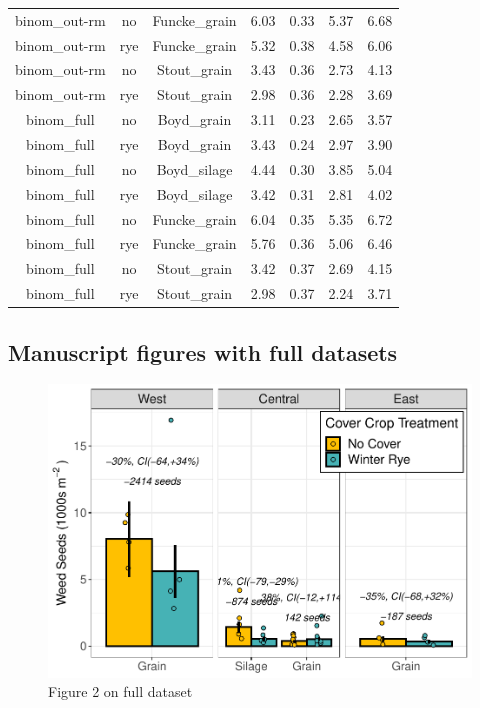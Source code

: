 \documentclass[]{article}
\begin{document}
\begin{table}[H]
\begin{tabular}[t]{ccccccc}
\addlinespace
\rowcolor{gray!6}  binom\_out-rm & no & Funcke\_grain & 6.03 & 0.33 & 5.37 & 6.68\\
binom\_out-rm & rye & Funcke\_grain & 5.32 & 0.38 & 4.58 & 6.06\\
\rowcolor{gray!6}  binom\_out-rm & no & Stout\_grain & 3.43 & 0.36 & 2.73 & 4.13\\
binom\_out-rm & rye & Stout\_grain & 2.98 & 0.36 & 2.28 & 3.69\\
\rowcolor{gray!6}  binom\_full & no & Boyd\_grain & 3.11 & 0.23 & 2.65 & 3.57\\
\addlinespace
binom\_full & rye & Boyd\_grain & 3.43 & 0.24 & 2.97 & 3.90\\
\rowcolor{gray!6}  binom\_full & no & Boyd\_silage & 4.44 & 0.30 & 3.85 & 5.04\\
binom\_full & rye & Boyd\_silage & 3.42 & 0.31 & 2.81 & 4.02\\
\rowcolor{gray!6}  binom\_full & no & Funcke\_grain & 6.04 & 0.35 & 5.35 & 6.72\\
binom\_full & rye & Funcke\_grain & 5.76 & 0.36 & 5.06 & 6.46\\
\addlinespace
\rowcolor{gray!6}  binom\_full & no & Stout\_grain & 3.42 & 0.37 & 2.69 & 4.15\\
binom\_full & rye & Stout\_grain & 2.98 & 0.37 & 2.24 & 3.71\\
\bottomrule
\end{tabular}
\end{table}

\newpage

\hypertarget{manuscript-figures-with-full-datasets}{%
\subsection{Manuscript figures with full
datasets}\label{manuscript-figures-with-full-datasets}}

\begin{figure}
\centering
\includegraphics{supp-mat_files/figure-latex/unnamed-chunk-7-1.pdf}
\caption{Figure 2 on full dataset}
\end{figure}
\end{document}

